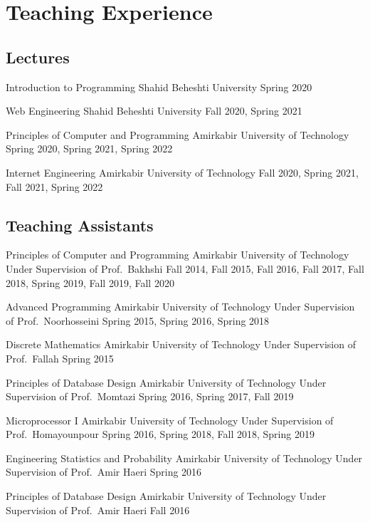 \section{Teaching Experience}

\subsection{Lectures}
\cventry{}
  {Introduction to Programming}
  {}
  {Shahid Beheshti University}
  {}
  {Spring 2020}

\cventry{}
  {Web Engineering}
  {}
  {Shahid Beheshti University}
  {}
  {Fall 2020, Spring 2021}

\cventry{}
  {Principles of Computer and Programming}
  {}
  {Amirkabir University of Technology}
  {}
  {Spring 2020, Spring 2021, Spring 2022}

\cventry{}
  {Internet Engineering}
  {}
  {Amirkabir University of Technology}
  {}
  {Fall 2020, Spring 2021, Fall 2021, Spring 2022}

\iffalse%
\subsection{Teaching Assistants}

\cventry{}
  {Principles of Computer and Programming}
  {}
  {Amirkabir University of Technology}
  {Under Supervision of Prof.\ Bakhshi}
  {Fall 2014, Fall 2015, Fall 2016, Fall 2017, Fall 2018, Spring 2019, Fall 2019, Fall 2020}

\cventry{}
  {Advanced Programming}
  {}
  {Amirkabir University of Technology}
  {Under Supervision of Prof.\ Noorhosseini}
  {Spring 2015, Spring 2016, Spring 2018}

\cventry{}
  {Discrete Mathematics}
  {}
  {Amirkabir University of Technology}
  {Under Supervision of Prof.\ Fallah}
  {Spring 2015}

\cventry{}
  {Principles of Database Design}
  {}
  {Amirkabir University of Technology}
  {Under Supervision of Prof.\ Momtazi}
  {Spring 2016, Spring 2017, Fall 2019}

\cventry{}
  {Microprocessor I}
  {}
  {Amirkabir University of Technology}
  {Under Supervision of Prof.\ Homayounpour}
  {Spring 2016, Spring 2018, Fall 2018, Spring 2019}

\cventry{}
  {Engineering Statistics and Probability}
  {}
  {Amirkabir University of Technology}
  {Under Supervision of Prof.\ Amir Haeri}
  {Spring 2016}

\cventry{}
  {Principles of Database Design}
  {}
  {Amirkabir University of Technology}
  {Under Supervision of Prof.\ Amir Haeri}
  {Fall 2016}

